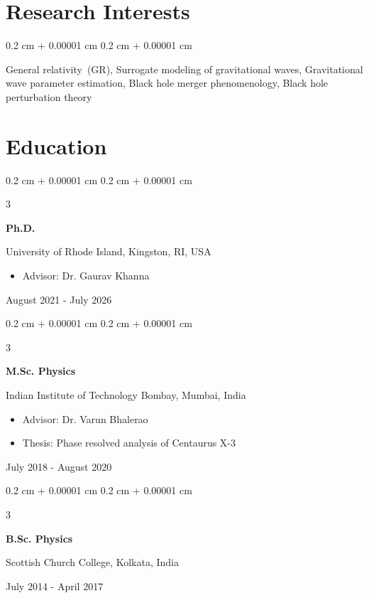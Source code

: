\documentclass[10pt, letterpaper]{article}
\newenvironment{highlights}{
    \begin{itemize}[
        topsep=0.10 cm,
        parsep=0.10 cm,
        partopsep=0pt,
        itemsep=0pt,
        leftmargin=0.4 cm + 10pt
    ]
}{
    \end{itemize}
}
\newenvironment{onecolentry}{
    \begin{adjustwidth}{
        0.2 cm + 0.00001 cm
    }{
        0.2 cm + 0.00001 cm
    }
}{
    \end{adjustwidth}
}
\newenvironment{threecolentry}[3][]{
    \onecolentry
    \def\thirdColumn{#3}
    \setcolumnwidth{2.5 cm, \fill, 4.5 cm}
    \begin{paracol}{3}
    {\raggedright #2} \switchcolumn
}{
    \switchcolumn \raggedleft \thirdColumn
    \end{paracol}
    \endonecolentry
}
\begin{document}
\vspace{0.3 cm - 0.3 cm}

\section{Research Interests}
  \begin{onecolentry}
    General relativity~(GR), Surrogate modeling of gravitational waves, Gravitational wave parameter estimation, Black hole merger phenomenology, Black hole perturbation theory
  \end{onecolentry}

\section{Education}
  \begin{threecolentry}{\textbf{Ph.D.}}{
    August 2021 - July 2026
  }
    University of Rhode Island, Kingston, RI, USA
    \begin{highlights}
      \item Advisor: Dr. Gaurav Khanna
    \end{highlights}
  \end{threecolentry}

\begin{threecolentry}{\textbf{M.Sc. Physics}}{
    July 2018 - August 2020
  }
    Indian Institute of Technology Bombay, Mumbai, India
  \begin{highlights}
    \item Advisor: Dr. Varun Bhalerao
    \item Thesis: Phase resolved analysis of Centaurus X-3
  \end{highlights}
\end{threecolentry} 

\begin{threecolentry}{\textbf{B.Sc. Physics}}{
  July 2014 - April 2017
}
  Scottish Church College, Kolkata, India
\end{threecolentry}
\end{document}
